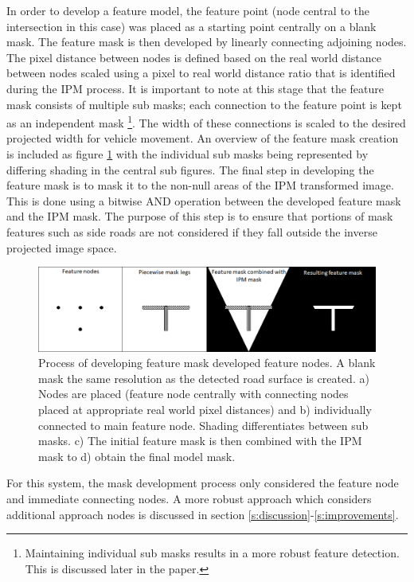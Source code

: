 \documentclass[]{aiaa-tc}%
\begin{document}
In order to develop a feature model, the feature point (node central to the intersection in this case) was placed as a starting point centrally on a blank mask. The feature mask is then developed by linearly connecting adjoining nodes. The pixel distance between nodes is defined based on the real world distance between nodes scaled using a pixel to real world distance ratio that is identified during the IPM process. It is important to note at this stage that the feature mask consists of multiple sub masks; each connection to the feature point is kept as an independent mask \footnote{Maintaining individual sub masks results in a more robust feature detection. This is discussed later in the paper.}. The width of these connections is scaled to the desired projected width for vehicle movement. An overview of the feature mask creation is included as figure \ref{f:featureMaskDevelopment} with the individual sub masks being represented by differing shading in the central sub figures. The final step in developing the feature mask is to mask it to the non-null areas of the IPM transformed image. This is done using a bitwise AND operation between the developed feature mask and the IPM mask. The purpose of this step is to ensure that portions of mask features such as side roads are not considered if they fall outside the inverse projected image space. 

\begin{figure}
	\centering
	\includegraphics[width=1\textwidth]{FeatureMatching/featureMaskDevelopment.png}
	\caption{Process of developing feature mask developed feature nodes. A blank mask the same resolution as the detected road surface is created. a) Nodes are placed (feature node centrally with connecting nodes placed at appropriate real world pixel distances) and b) individually connected to main feature node. Shading differentiates between sub masks. c) The initial feature mask is then combined with the IPM mask to d) obtain the final model mask.}
	\label{f:featureMaskDevelopment}
\end{figure}

For this system, the mask development process only considered the feature node and immediate connecting nodes. A more robust approach which considers additional approach nodes is discussed in section \ref{s:discussion}-\ref{s:improvements}.
\end{document}

